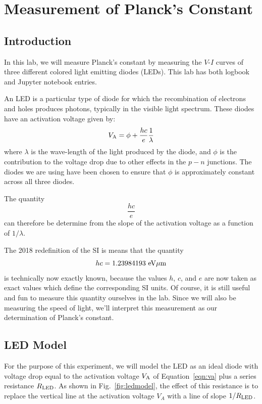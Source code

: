 
\chapter{Measurement of Planck's Constant}

\section{Introduction}

In this lab, we will measure Planck's constant by measuring the
$V$-$I$ curves of three different colored light emitting diodes
(LEDs).  This lab has both logbook and Jupyter notebook entries.


An LED is a particular type of diode for which the recombination of
electrons and holes produces photons, typically in the visible light
spectrum.  These diodes have an activation voltage given by:
\begin{equation} \label{eqn:va}
V_{\rm A} = \phi + \frac{hc}{e}\frac{1}{\lambda}
\end{equation}
where $\lambda$ is the wave-length of the light produced by the diode,
and $\phi$ is the contribution to the voltage drop due to other
effects in the $p-n$ junctions.  The diodes we are using have been
chosen to ensure that $\phi$ is approximately constant across all
three diodes.

The quantity
\begin{displaymath}
\frac{hc}{e}
\end{displaymath}
can therefore be determine from the slope of the activation voltage as a function of $1/\lambda$.

The 2018 redefinition of the SI is means that the quantity
\begin{displaymath}
hc = 1.23984193~\rm eV \mu m
\end{displaymath}
is technically now exactly known, because the values $h$, $c$, and $e$
are now taken as exact values which define the corresponding SI
units. Of course, it is still useful and fun to measure this quantity
ourselves in the lab.  Since we will also be measuring the speed of
light, we'll interpret this measurement as our determination of
Planck's constant.

\section{LED Model}

For the purpose of this experiment, we will model the LED as an ideal
diode with voltage drop equal to the activation voltage $V_{\rm A}$ of
Equation~\ref{eqn:va} plus a series resistance $R_{\rm LED}$.  As
shown in Fig.~\ref{fig:ledmodel}, the effect of this resistance is to
replace the vertical line at the activation voltage $V_A$ with a line
of slope $1/R_{\rm LED}$.

